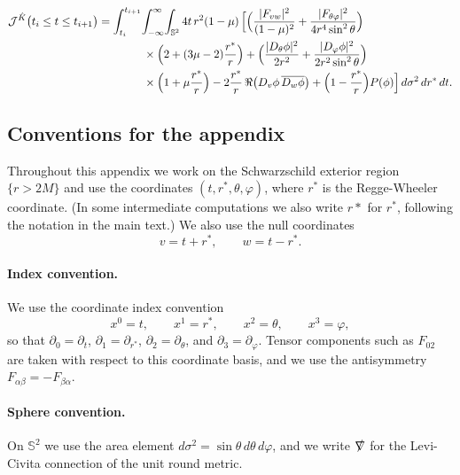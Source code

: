 \documentclass[11pt]{article}
\numberwithin{equation}{section}
\theoremstyle{plain}
\theoremstyle{definition}
\theoremstyle{remark}
\begin{document}
\begin{eqnarray}\label{JK}
\mathcal{J}^{\hat{K}}\bigl(t_{i}\le t\le t_{i+1}\bigr)
&=
\int_{t_{i}}^{t_{i+1}}\!\int_{-\infty}^{\infty}\!\int_{\mathbb S^{2}}
4t\,r^{2}(1-\mu)\,
\Bigl[
\Bigl(
\frac{|F_{vw}|^{2}}{(1-\mu)^{2}}
+\frac{|F_{\theta\varphi}|^{2}}{4r^{4}\sin^{2}\theta}
\Bigr)\nonumber\\
&\qquad\qquad\times
\Bigl(2+(3\mu-2)\frac{r^{\ast}}{r}\Bigr)
+\Bigl(
\frac{|D_{\theta}\phi|^{2}}{2r^{2}}
+\frac{|D_{\varphi}\phi|^{2}}{2r^{2}\sin^{2}\theta}
\Bigr)\nonumber\\
&\qquad\qquad\times
\Bigl(1+\mu\frac{r^{\ast}}{r}\Bigr)
-2\frac{r^{\ast}}{r}\,\Re\bigl(D_{v}\phi\,\overline{D_{w}\phi}\bigr)
+\Bigl(1-\frac{r^{\ast}}{r}\Bigr)P(\phi)
\Bigr]\,d\sigma^{2}\,dr^{\ast}\,dt.
\end{eqnarray}

\subsection{Conventions for the appendix}
\label{app:conventions}

Throughout this appendix we work on the Schwarzschild exterior region $\{r>2M\}$ and use the coordinates $(t,r^{\ast},\theta,\varphi)$, where $r^{\ast}$ is the Regge-Wheeler coordinate. (In some intermediate computations we also write $r*$ for $r^{\ast}$, following the notation in the main text.) We also use the null coordinates
\begin{equation}
v=t+r^{\ast},\qquad w=t-r^{\ast}.
\end{equation}

\paragraph{Index convention.}
We use the coordinate index convention
\begin{equation}
x^{0}=t,\qquad x^{1}=r^{\ast},\qquad x^{2}=\theta,\qquad x^{3}=\varphi,
\end{equation}
so that $\partial_{0}=\partial_{t}$, $\partial_{1}=\partial_{r^{\ast}}$, $\partial_{2}=\partial_{\theta}$, and $\partial_{3}=\partial_{\varphi}$.
Tensor components such as $F_{0 2}$ are taken with respect to this coordinate basis, and we use the antisymmetry $F_{\alpha\beta}=-F_{\beta\alpha}$.

\paragraph{Sphere convention.}
On $\mathbb S^{2}$ we use the area element $d\sigma^{2}=\sin\theta\,d\theta\,d\varphi$, and we write $\slashed\nabla$ for the Levi-Civita connection of the unit round metric.
\end{document}
